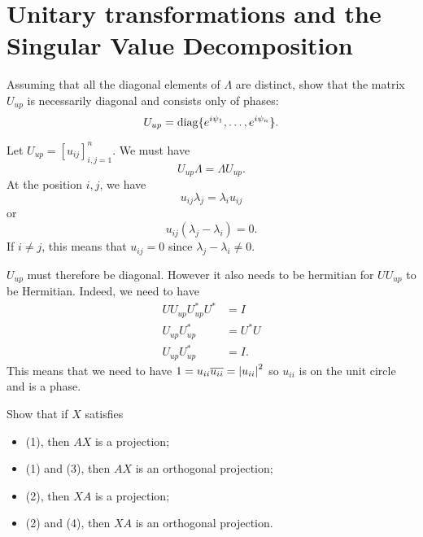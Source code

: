 \section{Unitary transformations and the Singular Value Decomposition}

Assuming that all the diagonal elements of \(\Lambda\) are distinct, show that the matrix \(U_{up}\) is necessarily diagonal and consists only of phases:
\[
U_{up} = \operatorname{diag}\{e^{i\psi_1}, \dots, e^{i \psi_n}\}.
\]

\begin{solution}
	Let $U_{up} = [u_{ij}]_{i,j=1}^{n}$.
	We must have
	\[ U_{up}\Lambda = \Lambda U_{up}. \]
	At the position $i,j$, we have
	\[ u_{ij} \lambda_j = \lambda_i u_{ij} \]
	or
	\[ u_{ij} (\lambda_j - \lambda_i) = 0. \]
	If $i \neq j$, this means that $u_{ij} = 0$ since $\lambda_j - \lambda_i \neq 0$.
	
	$U_{up}$ must therefore be diagonal.
	However it also needs to be hermitian for $UU_{up}$ to be Hermitian.
	Indeed, we need to have
	\begin{align*}
	UU_{up} U_{up}^*U^* & = I\\
	U_{up} U_{up}^* & = U^*U\\
	U_{up} U_{up}^* & = I.
	\end{align*}
	This means that we need to have $1 = u_{ii}\overline{u_{ii}} = {\left\lvert u_{ii}\right\lvert}^2$
	so $u_{ii}$ is on the unit circle and is a phase.
\end{solution}

Show that if \(X\) satisfies
\begin{itemize}
	\item (1), then \(AX\) is a projection;
	\item (1) and (3), then \(AX\) is an orthogonal projection;
	\item (2), then \(XA\) is a projection;
	\item (2) and (4), then \(XA\) is an orthogonal projection.
\end{itemize}

